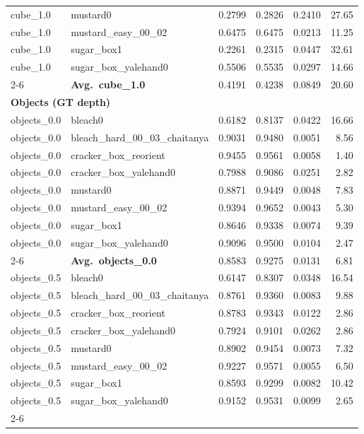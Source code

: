 \begin{longtable}{llrrrr}
  cube_1.0 & mustard0 & 0.2799 & 0.2826 & 0.2410 & 27.65 \\
  cube_1.0 & mustard\_easy\_00\_02 & 0.6475 & 0.6475 & 0.0213 & 11.25 \\
  cube_1.0 & sugar\_box1 & 0.2261 & 0.2315 & 0.0447 & 32.61 \\
  cube_1.0 & sugar\_box\_yalehand0 & 0.5506 & 0.5535 & 0.0297 & 14.66 \\
  \cmidrule{2-6}
  & \textbf{Avg.~cube_1.0} & 0.4191 & 0.4238 & 0.0849 & 20.60 \\
  \midrule
\multicolumn{6}{l}{\textbf{Objects (GT depth)}} \\
\midrule
  objects_0.0 & bleach0 & 0.6182 & 0.8137 & 0.0422 & 16.66 \\
  objects_0.0 & bleach\_hard\_00\_03\_chaitanya & 0.9031 & 0.9480 & 0.0051 & 8.56 \\
  objects_0.0 & cracker\_box\_reorient & 0.9455 & 0.9561 & 0.0058 & 1.40 \\
  objects_0.0 & cracker\_box\_yalehand0 & 0.7988 & 0.9086 & 0.0251 & 2.82 \\
  objects_0.0 & mustard0 & 0.8871 & 0.9449 & 0.0048 & 7.83 \\
  objects_0.0 & mustard\_easy\_00\_02 & 0.9394 & 0.9652 & 0.0043 & 5.30 \\
  objects_0.0 & sugar\_box1 & 0.8646 & 0.9338 & 0.0074 & 9.39 \\
  objects_0.0 & sugar\_box\_yalehand0 & 0.9096 & 0.9500 & 0.0104 & 2.47 \\
  \cmidrule{2-6}
  & \textbf{Avg.~objects_0.0} & 0.8583 & 0.9275 & 0.0131 & 6.81 \\
  \midrule
  objects_0.5 & bleach0 & 0.6147 & 0.8307 & 0.0348 & 16.54 \\
  objects_0.5 & bleach\_hard\_00\_03\_chaitanya & 0.8761 & 0.9360 & 0.0083 & 9.88 \\
  objects_0.5 & cracker\_box\_reorient & 0.8783 & 0.9343 & 0.0122 & 2.86 \\
  objects_0.5 & cracker\_box\_yalehand0 & 0.7924 & 0.9101 & 0.0262 & 2.86 \\
  objects_0.5 & mustard0 & 0.8902 & 0.9454 & 0.0073 & 7.32 \\
  objects_0.5 & mustard\_easy\_00\_02 & 0.9227 & 0.9571 & 0.0055 & 6.50 \\
  objects_0.5 & sugar\_box1 & 0.8593 & 0.9299 & 0.0082 & 10.42 \\
  objects_0.5 & sugar\_box\_yalehand0 & 0.9152 & 0.9531 & 0.0099 & 2.65 \\
  \cmidrule{2-6}

\end{longtable}
